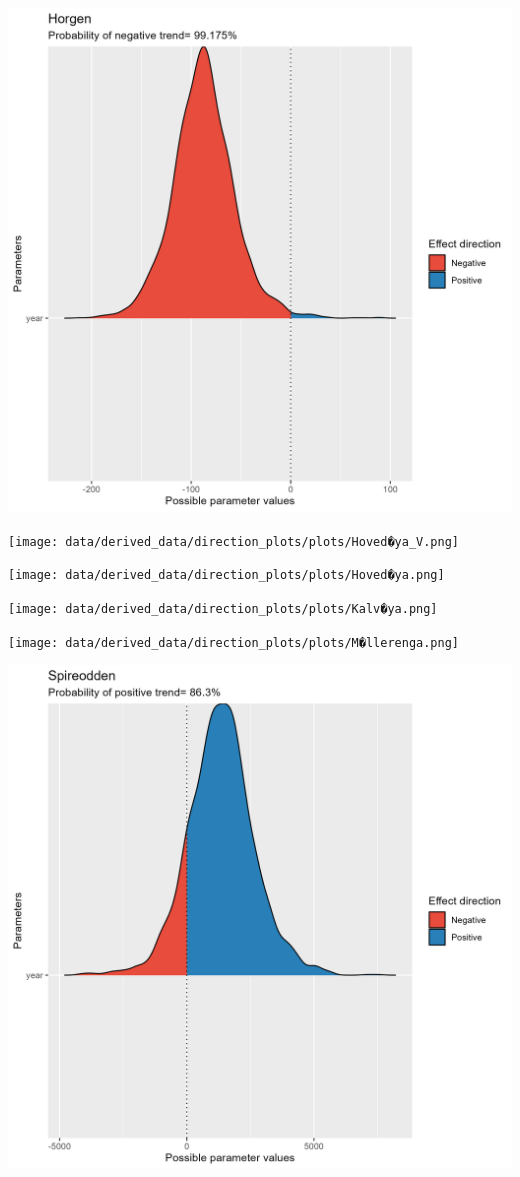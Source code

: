 \documentclass[
  letterpaper,
  DIV=11,
  numbers=noendperiod]{scrreport}
\begin{document}
\includegraphics{data/derived_data/direction_plots/plots/Horgen.png}

\texttt{[image: data/derived\_data/direction\_plots/plots/Hoved�ya\_V.png]}

\texttt{[image: data/derived\_data/direction\_plots/plots/Hoved�ya.png]}

\texttt{[image: data/derived\_data/direction\_plots/plots/Kalv�ya.png]}

\texttt{[image: data/derived\_data/direction\_plots/plots/M�llerenga.png]}

\includegraphics{data/derived_data/direction_plots/plots/Spireodden.png}
\end{document}
